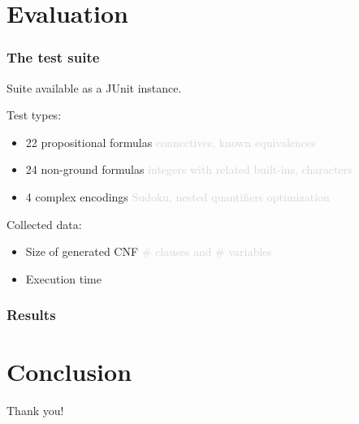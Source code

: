 \documentclass[smaller,dvipsnames,ratio=169]{beamer}
\begin{document}
  \section{Evaluation}

  \begin{frame}
    \frametitle{The test suite}
    Suite available as a \alert{JUnit} instance.

    Test types:
    \begin{itemize}
      \item 22 propositional formulas \textcolor{lightgray}{connectives, known equivalences}
      \item 24 non-ground formulas \textcolor{lightgray}{integers with related built-ins, characters}
      \item 4 complex encodings \textcolor{lightgray}{Sudoku, nested quantifiers optimization}
    \end{itemize}
    Collected data:
    \begin{itemize}
      \item \alert{Size} of generated CNF \textcolor{lightgray}{\# clauses and \# variables}
      \item Execution \alert{time}
    \end{itemize}
  \end{frame}

  \begin{frame}
    \frametitle{Results}
  \end{frame}

  \section{Conclusion}


  \begin{frame}[standout]
    Thank you!
  \end{frame}
\end{document}
